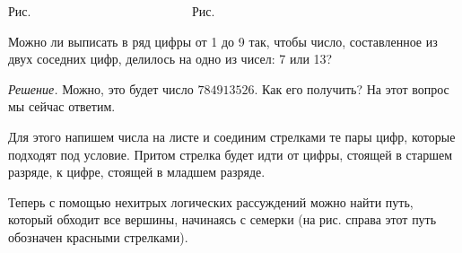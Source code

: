 \begin{example}
\begin{center}
\newline {}
\small Рис. \images  \;\ \;\ \;\ \;\ \;\ \;\ \;\ \;\ \;\ \;\ \;\ \;\ \;\ \;\ \;\ \;\ \;\ \;\ \;\ \;\ \;\ \;\ \;\ \;\ \;\ \small Рис. \images \;\ \;\ \;\ \;\ \;\ \;\ 
\end{center}
\end{example}

\begin{example}
	Можно ли выписать в ряд цифры от 1 до 9 так, чтобы число, составленное из двух соседних цифр, делилось на одно из чисел: 7 или 13?
	
	\emph{Решение.} Можно, это будет число $784913526$. Как его получить? На этот вопрос мы сейчас ответим.

\begin{paracol}{2}	
	Для этого напишем числа на листе и соединим стрелками те пары цифр, которые подходят под условие. Притом стрелка будет идти от цифры, стоящей в старшем разряде, к цифре, стоящей в младшем разряде.
	
	Теперь с помощью нехитрых логических рассуждений можно найти путь, который обходит все вершины, начинаясь с семерки (на рис. справа этот путь обозначен красными стрелками).

\switchcolumn

\begin{center}
\end{center}
\end{paracol}
\end{example}
